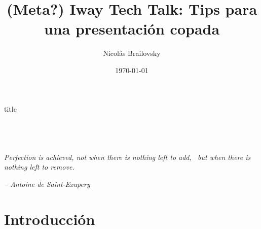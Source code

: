 \documentclass{beamer}
\institute[IWay Tech Talks]{IWay Tech Talks}
\date[] {\today}
\title[Tips para una presentaci\'on copada]{(Meta?) Iway Tech Talk: Tips para una presentaci\'on copada}
\subtitle{}
\author[]{Nicol\'as Brailovsky}
\begin{document}
\begin{frame}[plain]
	\begin{center}  \end{center}
	\rule{0em}{5pt}

	\begin{beamercolorbox}[sep=.1cm,shadow=true,rounded=true,center]{title}
		\inserttitle
	\end{beamercolorbox}

	\begin{columns}[onlytextwidth]
		\begin{center}
		\end{center}
		\begin{center} {\color{orange} \insertinstitute }  \end{center}
	\end{columns}

	\begin{center}
		{\color{orange} 
			\insertauthor \\
			\rule{0em}{8pt}
			\insertdate
		}
	\end{center}
\end{frame}

\begin{frame}
  \tableofcontents
\textit{Perfection is achieved, not when there is nothing left to add, \
         but when there is nothing left to remove. }
\begin{center}\textit{ -- Antoine de Saint-Exupery} \end{center}
\end{frame}


\section{Introducci\'on}
\end{document}
